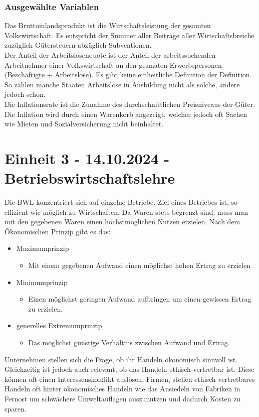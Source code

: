 \documentclass{article}
\begin{document}
	\subsubsection{Ausgewählte Variablen}
	Das Bruttoinlandsprodukt ist die Wirtschaftsleistung der gesamten Volkswirtschaft. Es entspricht der Summer aller Beiträge aller Wirtschaftsbreiche zuzüglich Gütersteuern abzüglich Subventionen.\\
	Der Anteil der Arbeitslosenquote ist der Anteil der arbeitssuchenden Arbeitnehmer einer Volkswirtschaft an den gesmaten Erwerbspersonen (Beschäftigte + Arbeitslose). Es gibt keine einheitliche Definition der Definition. So zählen manche Staaten Arbeitslose in Ausbildung nicht als solche, andere jedoch schon. \\
	Die Inflationsrate ist die Zunahme des durchschnittlichen Preisniveaus der Güter. Die Inflation wird durch einen Warenkorb angezeigt, welcher jedoch oft Sachen wie Mieten und Sozialversicherung nicht beinhaltet. \\
	\section{Einheit 3 - 14.10.2024 - Betriebswirtschaftslehre}
	Die BWL konzentriert sich auf einzelne Betriebe. Ziel eines Betriebes ist, so effizient wie möglich zu Wirtschaften. Da Waren stets begrenzt sind, muss man mit den gegebenen Waren einen höchstmöglichen Nutzen erzielen. Nach dem Ökonomischen Prinzip gibt es das:
	\begin{itemize}
		\item{Maximumprinzip}
		\begin{itemize}
			\item{Mit einem gegebenen Aufwand einen möglichst hohen Ertrag zu erzielen}
		\end{itemize}
		\item{Minimumprinzip}
		\begin{itemize}
			\item{Einen möglichst geringen Aufwand aufbringen um einen gewissen Ertrag zu erzielen.}
		\end{itemize}
		\item{generelles Extremumprinzip}
		\begin{itemize}
			\item{Das möglichst günstige Verhältnis zwischen Aufwand und Ertrag.}
		\end{itemize}
	\end{itemize}
	Unternehmen stellen sich die Frage, ob ihr Handeln ökonomisch sinnvoll ist. Gleichzeitig ist jedoch auch relevant, ob das Handeln ethisch vertretbar ist. Diese können oft einen Interessenskonflikt auslösen. Firmen, stellen ethisch vertretbares Handeln oft hinter ökonomisches Handeln wie das Ansiedeln von Fabriken in Fernost um schwächere Umweltauflagen auszunutzen und dadurch Kosten zu sparen. \\
\end{document}
